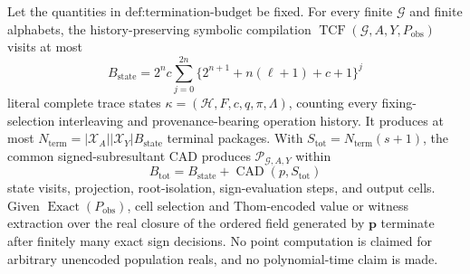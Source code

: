 Let the quantities in \(\text{def:termination-budget}\) be fixed. For every finite \(\mathcal G\) and finite alphabets, the history-preserving symbolic compilation \(\operatorname{TCF}(\mathcal G,A,Y,P_{\mathrm{obs}})\) visits at most
\[
B_{\mathrm{state}}=2^n c\sum_{j=0}^{2n}\bigl\{2^{n+1}+n(\ell+1)+c+1\bigr\}^j
\]
literal complete trace states \(\kappa=(\mathcal H,F,c,q,\pi,\Lambda)\), counting every fixing-selection interleaving and provenance-bearing operation history. It produces at most \(N_{\mathrm{term}}=|\mathcal X_A||\mathcal X_Y|B_{\mathrm{state}}\) terminal packages. With \(S_{\mathrm{tot}}=N_{\mathrm{term}}(s+1)\), the common signed-subresultant CAD produces \(\mathscr P_{\mathcal G,A,Y}\) within
\[
B_{\mathrm{tot}}=B_{\mathrm{state}}+\operatorname{CAD}(p,S_{\mathrm{tot}})
\]
state visits, projection, root-isolation, sign-evaluation steps, and output cells. Given \(\operatorname{Exact}(P_{\mathrm{obs}})\), cell selection and Thom-encoded value or witness extraction over the real closure of the ordered field generated by \(\mathbf p\) terminate after finitely many exact sign decisions. No point computation is claimed for arbitrary unencoded population reals, and no polynomial-time claim is made.